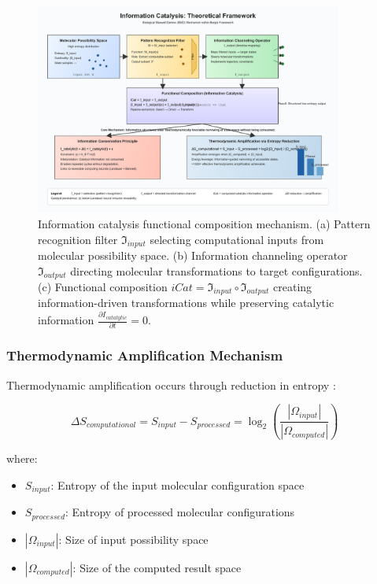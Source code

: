 \documentclass[12pt,a4paper]{article}
\begin{document}
\begin{figure}[H]
    \centering
    \includegraphics[width=0.9\textwidth]{images/information-catalysis.pdf}
    \caption{Information catalysis functional composition mechanism. (a) Pattern recognition filter $\mathfrak{I}_{input}$ selecting computational inputs from molecular possibility space. (b) Information channeling operator $\mathfrak{I}_{output}$ directing molecular transformations to target configurations. (c) Functional composition $iCat = \mathfrak{I}_{input} \circ \mathfrak{I}_{output}$ creating information-driven transformations while preserving catalytic information $\frac{\partial I_{catalytic}}{\partial t} = 0$.}
    \label{fig:catalysis_mechanism}
    \end{figure}


\subsubsection{Thermodynamic Amplification Mechanism}

Thermodynamic amplification occurs through reduction in entropy \cite{jarzynski1997nonequilibrium}:

\begin{equation}
\Delta S_{computational} = S_{input} - S_{processed} = \log_2\left(\frac{|\Omega_{input}|}{|\Omega_{computed}|}\right)
\end{equation}

where:
\begin{itemize}
\item $S_{input}$: Entropy of the input molecular configuration space
\item $S_{processed}$: Entropy of processed molecular configurations
\item $|\Omega_{input}|$: Size of input possibility space
\item $|\Omega_{computed}|$: Size of the computed result space
\end{itemize}
\end{document}
